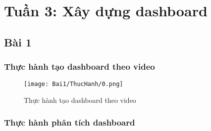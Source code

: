 \documentclass{article}
\begin{document}
\tableofcontents
\newpage
\listoffigures
\newpage
\section{Tuần 3: Xây dựng dashboard}
\subsection{Bài 1}

\subsubsection{Thực hành tạo dashboard theo video}

\begin{figure}[H]
\centering
\texttt{[image: Bai1/ThucHanh/0.png]}
\caption{Thực hành tạo dashboard theo video}
\end{figure}

\subsubsection{Thực hành phân tích dashboard}
\end{document}
